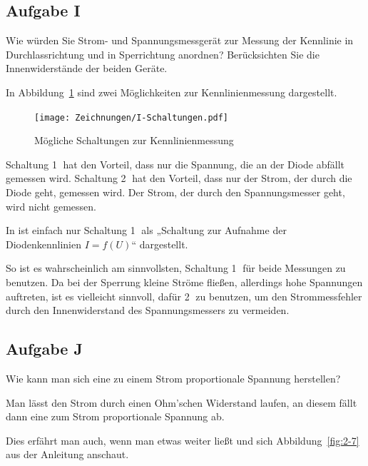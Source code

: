 \FloatBarrier
\subsection{Aufgabe I}
\label{s:I}

\begin{problem}
	Wie würden Sie Strom- und Spannungsmessgerät zur Messung der Kennlinie in
	Durchlassrichtung und in Sperrichtung anordnen? Berücksichten Sie die
	Innenwiderstände der beiden Geräte.
\end{problem}

In Abbildung~\ref{fig:I-Schaltungen} sind zwei Möglichkeiten zur
Kennlinienmessung dargestellt.

\begin{figure}[htbp]
	\centering
	\caption{%
		Mögliche Schaltungen zur Kennlinienmessung
	}
	\label{fig:I-Schaltungen}
	\texttt{[image: Zeichnungen/I-Schaltungen.pdf]}
\end{figure}

Schaltung \textcircled 1 hat den Vorteil, dass nur die Spannung, die an der
Diode abfällt gemessen wird. Schaltung \textcircled 2 hat den Vorteil, dass nur
der Strom, der durch die Diode geht, gemessen wird. Der Strom, der durch den
Spannungsmesser geht, wird nicht gemessen.

In \cite[Bild 14.2]{beuth/elementare_elektronik} ist einfach nur Schaltung
\textcircled 1 als „Schaltung zur Aufnahme der Diodenkennlinien $I = f(U)$“
dargestellt.

So ist es wahrscheinlich am sinnvollsten, Schaltung \textcircled 1 für beide
Messungen zu benutzen. Da bei der Sperrung kleine Ströme fließen, allerdings
hohe Spannungen auftreten, ist es vielleicht sinnvoll, dafür \textcircled 2 zu
benutzen, um den Strommessfehler durch den Innenwiderstand des Spannungsmessers
zu vermeiden.

\FloatBarrier
\subsection{Aufgabe J}

\begin{problem}
	Wie kann man sich eine zu einem Strom proportionale Spannung herstellen?
\end{problem}

Man lässt den Strom durch einen Ohm'schen Widerstand laufen, an diesem fällt
dann eine zum Strom proportionale Spannung ab.

Dies erfährt man auch, wenn man etwas weiter ließt und sich
Abbildung~\ref{fig:2-7} aus der Anleitung anschaut.


